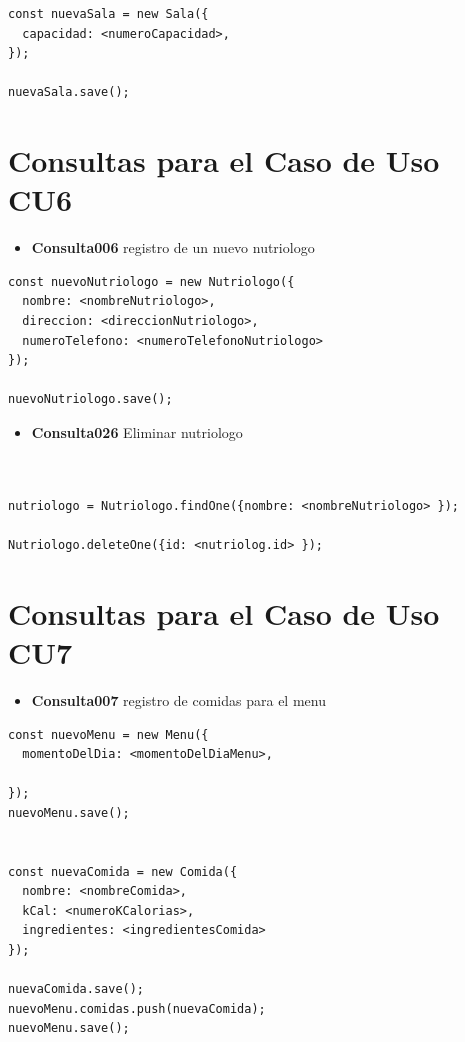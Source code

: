 \begin{verbatim}
const nuevaSala = new Sala({
  capacidad: <numeroCapacidad>,
});
    
nuevaSala.save();
\end{verbatim}


\section{Consultas para el Caso de Uso CU6}

\begin{itemize}
    \item \textbf{Consulta006} registro de un nuevo nutriologo
\end{itemize}

\begin{verbatim}
const nuevoNutriologo = new Nutriologo({
  nombre: <nombreNutriologo>,
  direccion: <direccionNutriologo>,
  numeroTelefono: <numeroTelefonoNutriologo>
});
    
nuevoNutriologo.save();

\end{verbatim}

\begin{itemize}
    \item \textbf{Consulta026} Eliminar nutriologo
\end{itemize}

\begin{verbatim}


nutriologo = Nutriologo.findOne({nombre: <nombreNutriologo> });

Nutriologo.deleteOne({id: <nutriolog.id> });
\end{verbatim}


\section{Consultas para el Caso de Uso CU7}

\begin{itemize}
    \item \textbf{Consulta007} registro de comidas para el menu
\end{itemize}

\begin{verbatim}
const nuevoMenu = new Menu({
  momentoDelDia: <momentoDelDiaMenu>,

});
nuevoMenu.save();


const nuevaComida = new Comida({
  nombre: <nombreComida>,
  kCal: <numeroKCalorias>,
  ingredientes: <ingredientesComida>
});
    
nuevaComida.save();
nuevoMenu.comidas.push(nuevaComida);
nuevoMenu.save();

\end{verbatim}


